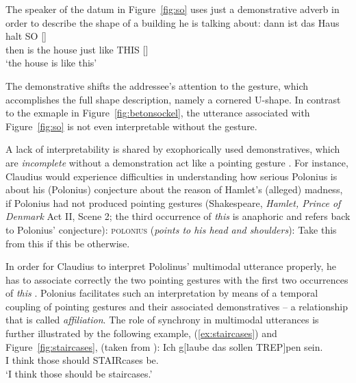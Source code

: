 \documentclass[output=paper]{langsci/langscibook}
\begin{document}
The speaker of the datum in Figure~\ref{fig:so} uses just a demonstrative adverb in order to describe the shape of a building he is talking about:
%
\ea \label{ex:so}
\gll dann ist das Haus halt {SO []} \\
     then is the house just {like THIS []} \\
\glt \enquote*{the house is like this} 
\z

The demonstrative shifts the addressee's attention to the gesture, which accomplishes the full shape description, namely a cornered U-shape.
%
In contrast to the exmaple in Figure~\ref{fig:betonsockel}, the utterance associated with Figure~\ref{fig:so} is not even interpretable without the gesture.


%
%
A lack of interpretability is shared by exophorically used demonstratives, which are \emph{incomplete}  without a demonstration act like a pointing gesture \citep[]{Kaplan:1989:a}.
%
For instance, Claudius would experience difficulties in understanding how serious Polonius is about his (Polonius) conjecture about the reason of Hamlet's (alleged) madness, if Polonius had not produced pointing gestures (Shakespeare,  \textit{Hamlet, Prince of Denmark} Act II, Scene 2; the third occurrence of \textit{this} is anaphoric and refers back to Polonius' conjecture):
%
\ea \label{ex:this}
\textsc{polonius} (\textit{points to his head and shoulders}): 
Take this from this if this be otherwise.
\z

In order for Claudius to interpret Pololinus' multimodal utterance properly, he has to associate correctly the two pointing gestures with the first two occurrences of \textit{this} \citep[cf. the problems discussed by][]{Kupffer:2014}. 
%
Polonius facilitates such an interpretation by means of a temporal coupling of pointing gestures and their associated demonstratives -- a relationship that is called \emph{affiliation}.
%
The role of synchrony in multimodal utterances is further illustrated by the following example, (\ref{ex:staircases}) and Figure~\ref{fig:staircases}, (taken from \citealp[]{Luecking:2013:a}):
%
\ea \label{ex:staircases}
\gll Ich g[laube das sollen TREP]pen sein.\\
     I think those should STAIRcases be. \\
\glt \enquote*{I think those should be staircases.}
\z
\end{document}
